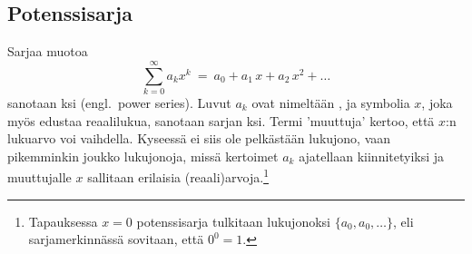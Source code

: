 \subsection{Potenssisarja} 

Sarjaa muotoa
\[
\sum_{k=0}^\infty a_k x^k\ =\ a_0 + a_1\,x + a_2\,x^2 + \ldots
\]
sanotaan ksi (engl.\ power series). Luvut $a_k$ ovat nimeltään 
%
, ja symbolia $x$, joka myös edustaa reaalilukua, sanotaan sarjan
ksi. Termi 'muuttuja' kertoo, että $x$:n lukuarvo voi vaihdella. Kyseessä ei siis
ole pelkästään lukujono, vaan pikemminkin joukko lukujonoja, missä kertoimet $a_k$ ajatellaan 
kiinnitetyiksi ja muuttujalle $x$ sallitaan erilaisia (reaali)arvoja.\footnote[2]{Tapauksessa
$x=0$ potenssisarja tulkitaan lukujonoksi $\{a_0,a_0,\ldots\}$, eli sarjamerkinnässä sovitaan,
että $0^0=1$.}

